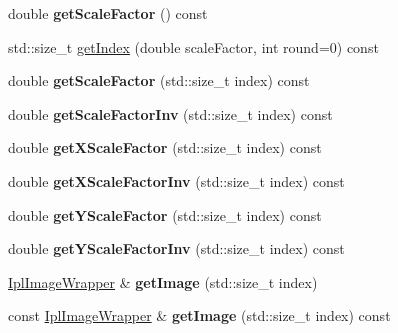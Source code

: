 \begin{DoxyCompactItemize}
\item 
\hypertarget{class_ipl_image_pyramid_ae74c2b5c82245556498dfd2d8be999d5}{
double {\bfseries getScaleFactor} () const }
\label{class_ipl_image_pyramid_ae74c2b5c82245556498dfd2d8be999d5}

\item 
std::size\_\-t \hyperlink{class_ipl_image_pyramid_a079949237facf732d588900b143ed3d6}{getIndex} (double scaleFactor, int round=0) const 
\item 
\hypertarget{class_ipl_image_pyramid_aa3c64a6e98d7359024e981b7e379bcd7}{
double {\bfseries getScaleFactor} (std::size\_\-t index) const }
\label{class_ipl_image_pyramid_aa3c64a6e98d7359024e981b7e379bcd7}

\item 
\hypertarget{class_ipl_image_pyramid_ab80f5de270c3dc4b846fa9a2a837db74}{
double {\bfseries getScaleFactorInv} (std::size\_\-t index) const }
\label{class_ipl_image_pyramid_ab80f5de270c3dc4b846fa9a2a837db74}

\item 
\hypertarget{class_ipl_image_pyramid_a073ae4c7abe797e55c70ffa4474343cd}{
double {\bfseries getXScaleFactor} (std::size\_\-t index) const }
\label{class_ipl_image_pyramid_a073ae4c7abe797e55c70ffa4474343cd}

\item 
\hypertarget{class_ipl_image_pyramid_afc2db4e914022424506122c477d92a10}{
double {\bfseries getXScaleFactorInv} (std::size\_\-t index) const }
\label{class_ipl_image_pyramid_afc2db4e914022424506122c477d92a10}

\item 
\hypertarget{class_ipl_image_pyramid_aa9c48a23c301fffa0f46381e2a8a2099}{
double {\bfseries getYScaleFactor} (std::size\_\-t index) const }
\label{class_ipl_image_pyramid_aa9c48a23c301fffa0f46381e2a8a2099}

\item 
\hypertarget{class_ipl_image_pyramid_af4b9e1c5cac8b5970fb5b2202ed41b44}{
double {\bfseries getYScaleFactorInv} (std::size\_\-t index) const }
\label{class_ipl_image_pyramid_af4b9e1c5cac8b5970fb5b2202ed41b44}

\item 
\hypertarget{class_ipl_image_pyramid_accc569ca15bfa53742cfa4d6b8aa2904}{
\hyperlink{class_ipl_image_wrapper}{IplImageWrapper} \& {\bfseries getImage} (std::size\_\-t index)}
\label{class_ipl_image_pyramid_accc569ca15bfa53742cfa4d6b8aa2904}

\item 
\hypertarget{class_ipl_image_pyramid_a8c474e16f4608021b7cd95a9f2431943}{
const \hyperlink{class_ipl_image_wrapper}{IplImageWrapper} \& {\bfseries getImage} (std::size\_\-t index) const }
\label{class_ipl_image_pyramid_a8c474e16f4608021b7cd95a9f2431943}


\end{DoxyCompactItemize}
